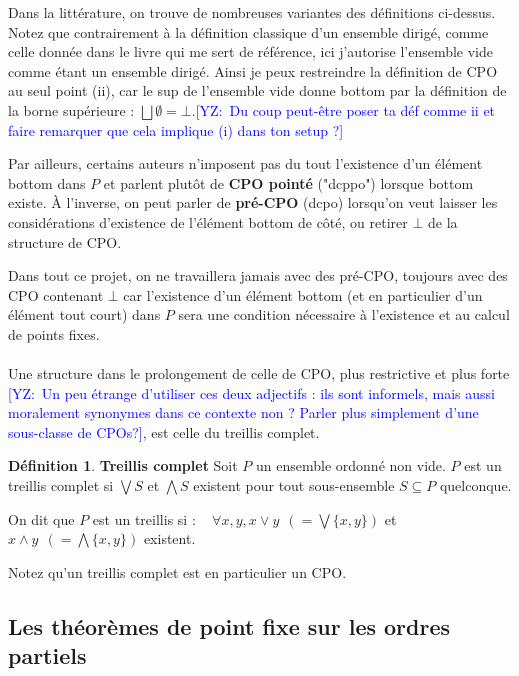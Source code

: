 \documentclass{article}
\newcommand{\yz}[1]{\textcolor{blue}{{[YZ:~#1]}}}
\theoremstyle{definition}
\newtheorem{definition}{Définition}[section]
\begin{document}
Dans la littérature, on trouve de nombreuses variantes des définitions
ci-dessus. Notez que contrairement à la définition classique d'un ensemble
dirigé, comme celle donnée dans le livre qui me sert de référence, ici
j'autorise l'ensemble vide comme étant un ensemble dirigé. Ainsi je peux
restreindre la définition de CPO au seul point (ii), car le sup de l'ensemble
vide donne bottom par la définition de la borne supérieure : $\bigsqcup
\emptyset = \bot$.\yz{Du coup peut-être poser ta déf comme ii et faire remarquer
que cela implique (i) dans ton setup ?}

Par ailleurs, certains auteurs n'imposent pas du tout l'existence d'un élément bottom dans $P$ et parlent plutôt de \textbf{CPO pointé} ("dcppo") lorsque bottom existe. À l'inverse, on peut parler de \textbf{pré-CPO} (dcpo) lorsqu'on veut laisser les considérations d'existence de l'élément bottom de côté, ou retirer $\bot$ de la structure de CPO. %

Dans tout ce projet, on ne travaillera jamais avec des pré-CPO, toujours avec des CPO contenant $\bot$ car l'existence d'un élément bottom (et en particulier d'un élément tout court) dans $P$ sera une condition nécessaire à l'existence et au calcul de points fixes.

\paragraph{}

Une structure dans le prolongement de celle de CPO, plus restrictive et plus
forte \yz{Un peu étrange d'utiliser ces deux adjectifs : ils sont informels,
  mais aussi moralement synonymes dans ce contexte non ? Parler plus simplement d'une sous-classe de CPOs?}, est celle du treillis complet.

\begin{definition}{\textbf{Treillis complet}}
Soit $P$ un ensemble ordonné non vide. $P$ est un treillis complet si $\bigvee S$ et $\bigwedge S$ existent pour tout sous-ensemble $S \subseteq P$ quelconque.

On dit que $P$ est un treillis si : ~ $\forall x, y, x \vee y ~~ (= \bigvee \{x,y\})$ et $x \wedge y ~~ (= \bigwedge \{x,y\})$ existent.
\end{definition}
Notez qu'un treillis complet est en particulier un CPO.

\subsection{Les théorèmes de point fixe sur les ordres partiels}
\end{document}
